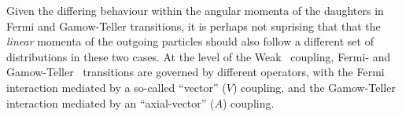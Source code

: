 Given the differing behaviour within the angular momenta of the daughters in Fermi and Gamow-Teller transitions, it is perhaps not suprising that that the \emph{linear} momenta of the outgoing particles should also follow a different set of distributions in these two cases.  At the level of the Weak~ coupling, Fermi- and Gamow-Teller~ transitions are governed by different operators, with the Fermi interaction mediated by a so-called ``vector'' ($V$) coupling, and the Gamow-Teller interaction mediated by an ``axial-vector'' ($A$) coupling.
~




